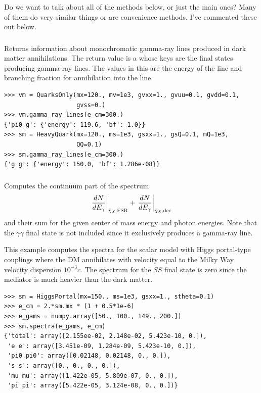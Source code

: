 {\color{red} Do we want to talk about all of the methods below, or just the main ones? Many of them do very similar things or are convenience methods. I've commented these out below.}

\subsubsection{}

Returns information about monochromatic gamma-ray lines produced in dark matter annihilations. The return value is a  whose keys are the final states producing gamma-ray lines. The values in this  are the energy of the line and branching fraction for annihilation into the line. 

\begin{verbatim}
>>> vm = QuarksOnly(mx=120., mv=1e3, gvxx=1., gvuu=0.1, gvdd=0.1,
                    gvss=0.)
>>> vm.gamma_ray_lines(e_cm=300.)
{'pi0 g': {'energy': 119.6, 'bf': 1.0}}
>>> sm = HeavyQuark(mx=120., ms=1e3, gsxx=1., gsQ=0.1, mQ=1e3,
                    QQ=0.1)
>>> sm.gamma_ray_lines(e_cm=300.)
{'g g': {'energy': 150.0, 'bf': 1.286e-08}}
\end{verbatim}

\subsubsection{}

Computes the continuum part of the spectrum
\begin{align}
    \left. \frac{dN}{dE_\gamma} \right|_{\bar{\chi}\chi,{\mathrm{FSR}}} + \left. \frac{dN}{dE_\gamma} \right|_{\bar{\chi}\chi,{\mathrm{dec}}}
\end{align}
and their sum for the given center of mass energy and photon energies. Note that the $\gamma\gamma$ final state is not included since it exclusively produces a gamma-ray line.

This example computes the spectra for the scalar model with Higgs portal-type couplings where the DM annihilates with velocity equal to the Milky Way velocity dispersion $10^{-3} c$. The spectrum for the $S S$ final state is zero since the mediator is much heavier than the dark matter.

\begin{verbatim}
>>> sm = HiggsPortal(mx=150., ms=1e3, gsxx=1., stheta=0.1)
>>> e_cm = 2.*sm.mx * (1 + 0.5*1e-6)
>>> e_gams = numpy.array([50., 100., 149., 200.])
>>> sm.spectra(e_gams, e_cm)
{'total': array([2.155ee-02, 2.148e-02, 5.423e-10, 0.]),
 'e e': array([3.451e-09, 1.284e-09, 5.423e-10, 0.]),
 'pi0 pi0': array([0.02148, 0.02148, 0., 0.]),
 's s': array([0., 0., 0., 0.]),
 'mu mu': array([1.422e-05, 5.809e-07, 0., 0.]),
 'pi pi': array([5.422e-05, 3.124e-08, 0., 0.])}
\end{verbatim}

